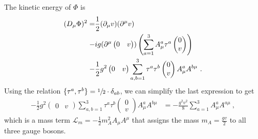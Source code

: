 The kinetic energy of $\Phi$ is
\begin{align}
	(D_\mu\Phi)^2 = &\frac{1}{2}(\partial_\mu v)(\partial^\mu v)\notag \\
	- &ig(\partial^\mu\begin{pmatrix} 0 & v \end{pmatrix}) \left(\sum_{a=1}^3A_\mu^a\tau^a\begin{pmatrix} 0 \\ v \end{pmatrix}\right)\notag \\
	- &\frac{1}{2}g^2\begin{pmatrix} 0 & v \end{pmatrix}\sum_{a,b=1}^{3}\tau^a\tau^b\begin{pmatrix} 0 \\ v \end{pmatrix}A_\mu^aA^{b\mu} \ .
\end{align}
Using the relation $\{\tau^a,\tau^b\}=\sfrac{1}{2}\cdot\delta_{ab}$, we can simplify the last expression to get
\begin{align}
	- \frac{1}{2}g^2\begin{pmatrix} 0 & v \end{pmatrix}\sum_{a,b=1}^{3}\tau^a\tau^b\begin{pmatrix} 0 \\ v \end{pmatrix}A_\mu^aA^{b\mu} &= - \frac{g^2v^2}{8}\sum_{a=1}^{3}A_\mu^aA^{a\mu} \ ,
\end{align}
which is a mass term $\mathcal{L}_m = -\frac{1}{2}m_A^2A_\mu A^\mu$ that assigns the mass $m_A = \frac{gv}{2}$ to all three gauge bosons.

